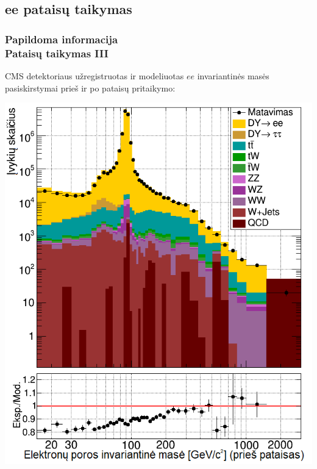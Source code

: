 \documentclass[xcolor=dvipsnames]{beamer}
\newcommand{\ee}{\mathit{ee}}
\begin{document}
\begin{frame}
\begin{minipage}{0.49\textwidth}
	\end{minipage}
\end{frame}

\begin{frame}
	\subsection{ee pataisų taikymas}
	\frametitle{Papildoma informacija\\ \small Pataisų taikymas III}
	CMS detektoriaus užregistruotas ir modeliuotas $\ee$ invariantinės masės pasiskirstymai prieš ir po pataisų pritaikymo:
	\begin{minipage}{0.49\textwidth}
		\centering
		\includegraphics[width=0.9\linewidth]{eeMassBefore_SMALL.png}
	\end{minipage}
	\hfill
	\begin{minipage}{0.49\textwidth}
		\centering

\end{minipage}
\end{frame}
\end{document}
